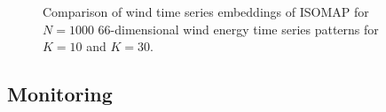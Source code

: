 \documentclass[10pt, conference, compsocconf]{IEEEtran}
\begin{document}
\begin{figure}[h]
\begin{center}
\caption{\label{fig:isomap}Comparison of wind time series embeddings of ISOMAP for $N=1000$ $66$-dimensional wind energy time series patterns for $K=10$ and $K=30$.}
\end{center}
\end{figure}


\subsection{Monitoring}
\label{sec:mon}
\end{document}
